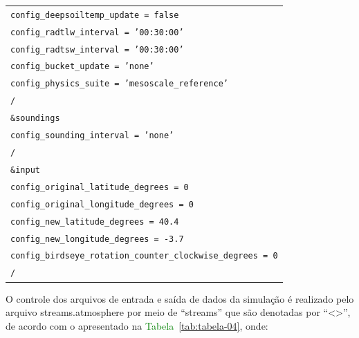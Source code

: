\documentclass[12pt,a4paper,oneside]{book}
\providecommand{\arraybackslash}{\tabularnewline}
\begin{document}
\begin{longtable}[]{@{}
  >{\raggedright\arraybackslash}p{}@{}}
\texttt{\hspace*{1em}config\_deepsoiltemp\_update = false} \\
\texttt{\hspace*{1em}config\_radtlw\_interval = '00:30:00'} \\
\texttt{\hspace*{1em}config\_radtsw\_interval = '00:30:00'} \\
\texttt{\hspace*{1em}config\_bucket\_update = 'none'} \\
\texttt{\hspace*{1em}config\_physics\_suite = 'mesoscale\_reference'} \\
\texttt{/} \\
\texttt{\&soundings} \\
\texttt{\hspace*{1em}config\_sounding\_interval = 'none'} \\
\texttt{/} \\
\texttt{\&input} \\
\texttt{\hspace*{1em}config\_original\_latitude\_degrees = 0} \\
\texttt{\hspace*{1em}config\_original\_longitude\_degrees = 0} \\
\texttt{\hspace*{1em}config\_new\_latitude\_degrees = 40.4} \\
\texttt{\hspace*{1em}config\_new\_longitude\_degrees = -3.7} \\
\texttt{\hspace*{1em}config\_birdseye\_rotation\_counter\_clockwise\_degrees = 0} \\
\texttt{/} \\
\end{longtable}

O controle dos arquivos de entrada e saída de dados da simulação é realizado pelo arquivo streams.atmosphere por meio de ``streams'' que são denotadas por ``\textless\textgreater'', de acordo com o apresentado na \textcolor{green}{Tabela~\ref*{tab:tabela-04}}, onde:
\end{document}
